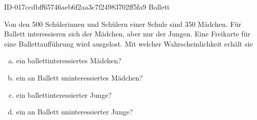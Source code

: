 \begin{exercise}
      {ID-017ccdbff65746aeb6f2aa3c7f24983702ff5fa9}
      {Ballett}
  \ifproblem\problem\par
    Von den 500 Schülerinnen und Schülern einer Schule sind 350 Mädchen.
    Für Ballett interessieren sich  der Mädchen, aber nur 
    der Jungen. Eine Freikarte für eine Ballettaufführung wird ausgelost.
    Mit welcher Wahrscheinlichkeit erhält sie
    \begin{enumerate}[a)]
      \squeeze
      \item ein ballettinteressiertes Mädchen?
      \item ein an Ballett uninteressiertes Mädchen?
      \item ein ballettinteressierter Junge?
      \item ein an Ballett uninteressierter Junge?
    \end{enumerate}
  \fi
  \ifoutcome\outcome
    \begin{center}
\end{center}
\end{exercise}
